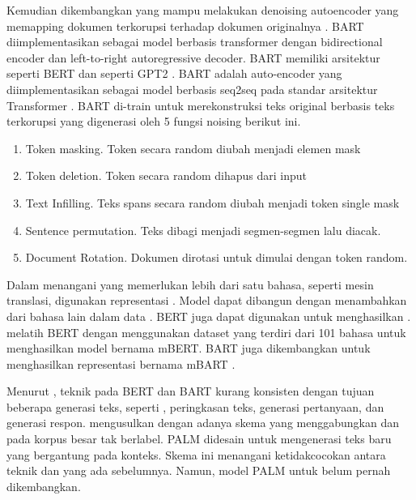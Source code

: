 Kemudian dikembangkan  yang mampu melakukan denoising autoencoder yang memapping dokumen terkorupsi terhadap dokumen originalnya .
\gls{BART} diimplementasikan sebagai model berbasis transformer dengan bidirectional encoder dan left-to-right autoregressive decoder.
\gls{BART} memiliki arsitektur  seperti \gls{BERT}  dan  seperti \gls{GPT2} .
\gls{BART}  adalah auto-encoder yang diimplementasikan sebagai model berbasis \gls{seq2seq} pada standar arsitektur Transformer .
\gls{BART} di-train untuk merekonstruksi teks original berbasis teks terkorupsi yang digenerasi oleh 5 fungsi noising berikut ini.
\begin{enumerate}
  \item Token masking.
  Token secara random diubah menjadi elemen mask
  \item Token deletion.
  Token secara random dihapus dari input
  \item Text Infilling.
  Teks spans secara random diubah menjadi token single mask
  \item Sentence permutation.
  Teks dibagi menjadi segmen-segmen lalu diacak.
  \item Document Rotation.
  Dokumen dirotasi untuk dimulai dengan token random.
\end{enumerate}


Dalam menangani  yang memerlukan lebih dari satu bahasa, seperti mesin translasi, digunakan representasi \mwordem{}.
Model \multil{} dapat dibangun dengan menambahkan  dari bahasa lain dalam data .
\gls{BERT} juga dapat digunakan untuk menghasilkan \mwordem{}.
\textcite{devlin2019} melatih \gls{BERT} dengan menggunakan dataset yang terdiri dari 101 bahasa untuk menghasilkan \multil{} model bernama mBERT.
\gls{BART} juga dikembangkan untuk menghasilkan representasi \mwordem{} bernama mBART .

Menurut \textcite{bi2020}, teknik \pretraining{} pada \gls{BERT} dan \gls{BART} kurang konsisten dengan tujuan beberapa  generasi teks, seperti , peringkasan teks, generasi pertanyaan, dan generasi respon.
\textcite{bi2020} mengusulkan  dengan adanya skema yang menggabungkan \pretraining{}  dan   pada korpus besar tak berlabel.
\gls{PALM} didesain untuk mengenerasi teks baru yang bergantung pada konteks.
Skema ini menangani ketidakcocokan antara teknik \pretraining{} dan  yang ada sebelumnya.
Namun, model \gls{PALM} untuk \mwordem{} belum pernah dikembangkan.
